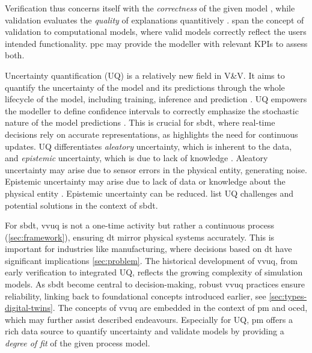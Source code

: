 Verification thus concerns itself with the \textit{correctness} of the given model \autocite{Sargent2010wsc}, while validation evaluates the \textit{quality} of explanations quantitively \autocite{Oberkampf2004amr}. \Textcite{iso2017systems} span the concept of validation to computational models, where valid models correctly reflect the users intended functionality. \gls{ppc} may provide the modeller with relevant KPIs to assess both.

\label{sec:uncertainty-quantification}
Uncertainty quantification (UQ) is a relatively new field in V\&V. It aims to quantify the uncertainty of the model and its predictions through the whole lifecycle of the model, including training, inference and prediction \autocite{sel2025survey}. UQ empowers the modeller to define confidence intervals to correctly emphasize the stochastic nature of the model predictions \autocite{volodina2021importance}. This is crucial for \gls{sbdt}, where real-time decisions rely on accurate representations, as \textcite{francis2021towards} highlights the need for continuous updates. UQ differentiates \textit{aleatory} uncertainty, which is inherent to the data, and \textit{epistemic} uncertainty, which is due to lack of knowledge \autocite{sel2025survey}. Aleatory uncertainty may arise due to sensor errors in the physical entity, generating noise. Epistemic uncertainty may arise due to lack of data or knowledge about the physical entity \autocite{thelen2023comprehensive}. Epistemic uncertainty can be reduced. \Textcite{abdoune2022handling} list UQ challenges and potential solutions in the context of \gls{sbdt}.

For \gls{sbdt}, \gls{vvuq} is not a one-time activity but rather a continuous process (\autoref{sec:framework}), ensuring \gls{dt} mirror physical systems accurately. This is important for industries like manufacturing, where decisions based on \gls{dt} have significant implications \autoref{sec:problem}.
The historical development of \gls{vvuq}, from early verification to integrated UQ, reflects the growing complexity of simulation models. As \gls{sbdt} become central to decision-making, robust \gls{vvuq} practices ensure reliability, linking back to foundational concepts introduced earlier, see \autoref{sec:types-digital-twins}. The concepts of \gls{vvuq} are embedded in the context of \gls{pm} and \gls{oced}, which may further assist described endeavours. Especially for UQ, \gls{pm} offers a rich data source to quantify uncertainty and validate models by providing a \textit{degree of fit} of the given process model.


